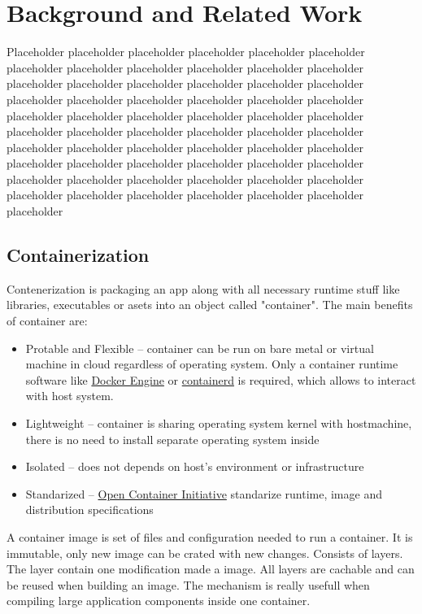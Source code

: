 \chapter{Background and Related Work}
\label{cha:background}

Placeholder placeholder placeholder placeholder placeholder placeholder placeholder placeholder placeholder placeholder placeholder placeholder placeholder placeholder placeholder placeholder placeholder placeholder placeholder placeholder placeholder placeholder placeholder placeholder placeholder placeholder placeholder placeholder placeholder placeholder placeholder placeholder placeholder placeholder placeholder placeholder placeholder placeholder placeholder placeholder placeholder placeholder placeholder placeholder placeholder placeholder placeholder placeholder placeholder placeholder placeholder placeholder placeholder placeholder placeholder placeholder placeholder placeholder placeholder placeholder placeholder



\section{Containerization}
\label{sec:containerization}

Contenerization is packaging an app along with all necessary runtime stuff like libraries, executables or asets into an object called "container". The main benefits of container are\cite{RedhatContainerization}:
\begin{itemize}
    \item Protable and Flexible -- container can be run on bare metal or virtual machine in cloud regardless of operating system. Only a container runtime software like \href{https://docs.docker.com/engine/}{Docker Engine} or \href{https://containerd.io/}{containerd} is required, which allows to interact with host system.
    \item Lightweight -- container is sharing operating system kernel with hostmachine, there is no need to install separate operating system inside
    \item Isolated -- does not depends on host's environment or infrastructure
    \item Standarized -- \href{https://opencontainers.org/}{Open Container Initiative} standarize runtime, image and distribution specifications
\end{itemize}
A container image is set of files and configuration needed to run a container. It is immutable, only new image can be crated with new changes. Consists of layers. The layer contain one modification made a image. All layers are cachable and can be reused when building an image. The mechanism is really usefull when compiling large application components inside one container\cite{DockerImage}.

